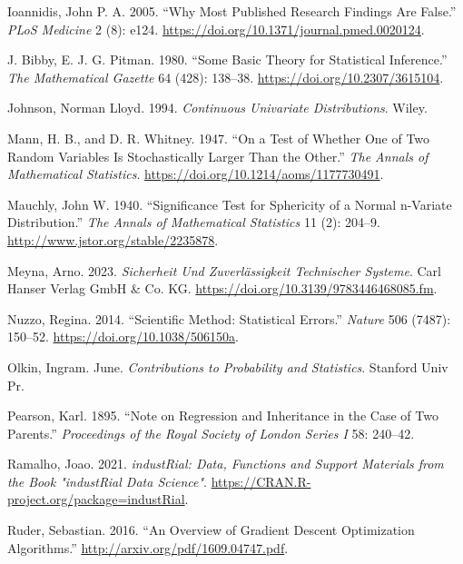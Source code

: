 \documentclass[
  a4paper,
]{scrbook}
\newlength{\cslhangindent}
\newenvironment{CSLReferences}[2] %
 {\begin{list}{}{%
  \setlength{\itemindent}{0pt}
  \setlength{\leftmargin}{0pt}
  \setlength{\parsep}{0pt}
  \ifodd #1
   \setlength{\leftmargin}{\cslhangindent}
   \setlength{\itemindent}{-1\cslhangindent}
  \fi
  \setlength{\itemsep}{#2\baselineskip}}}
 {\end{list}}
\begin{document}
\begin{CSLReferences}{1}{0}
Ioannidis, John P. A. 2005. {``Why Most Published Research Findings Are
False.''} \emph{{PLoS} Medicine} 2 (8): e124.
\url{https://doi.org/10.1371/journal.pmed.0020124}.

J. Bibby, E. J. G. Pitman. 1980. {``Some Basic Theory for Statistical
Inference.''} \emph{The Mathematical Gazette} 64 (428): 138--38.
\url{https://doi.org/10.2307/3615104}.

Johnson, Norman Lloyd. 1994. \emph{Continuous Univariate Distributions}.
Wiley.

Mann, H. B., and D. R. Whitney. 1947. {``On a Test of Whether One of Two
Random Variables Is Stochastically Larger Than the Other.''} \emph{The
Annals of Mathematical Statistics}.
\url{https://doi.org/10.1214/aoms/1177730491}.

Mauchly, John W. 1940. {``Significance Test for Sphericity of a Normal
n-Variate Distribution.''} \emph{The Annals of Mathematical Statistics}
11 (2): 204--9. \url{http://www.jstor.org/stable/2235878}.

Meyna, Arno. 2023. \emph{Sicherheit Und Zuverlässigkeit Technischer
Systeme}. Carl Hanser Verlag {GmbH} {\&} Co. {KG}.
\url{https://doi.org/10.3139/9783446468085.fm}.

Nuzzo, Regina. 2014. {``Scientific Method: Statistical Errors.''}
\emph{Nature} 506 (7487): 150--52.
\url{https://doi.org/10.1038/506150a}.

Olkin, Ingram. June. \emph{Contributions to Probability and Statistics}.
Stanford Univ Pr.

Pearson, Karl. 1895. {``Note on Regression and Inheritance in the Case
of Two Parents.''} \emph{Proceedings of the Royal Society of London
Series I} 58: 240--42.

Ramalho, Joao. 2021. \emph{industRial: Data, Functions and Support
Materials from the Book "industRial Data Science"}.
\url{https://CRAN.R-project.org/package=industRial}.

Ruder, Sebastian. 2016. {``An Overview of Gradient Descent Optimization
Algorithms.''} \url{http://arxiv.org/pdf/1609.04747.pdf}.


\end{CSLReferences}
\end{document}
